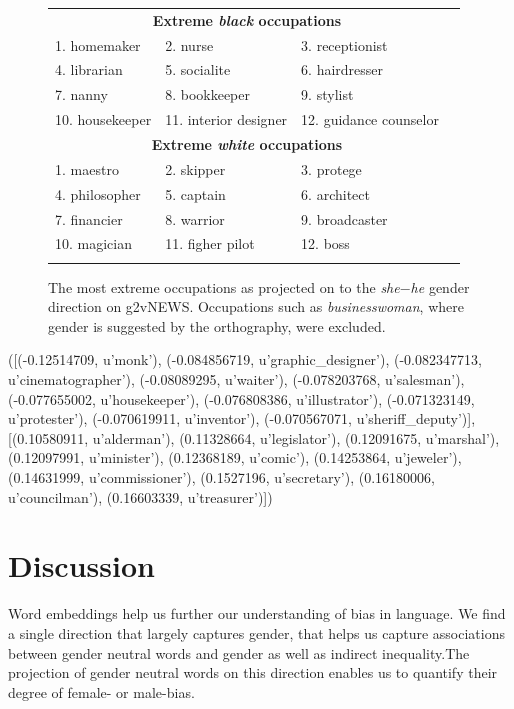 \documentclass{article}
\begin{document}
  \begin{figure}
\begin{tabular}{lllc}
\multicolumn{3}{c}{\bf{Extreme \emph{black} occupations}}\\
{1. homemaker} & {2. nurse} & {3. receptionist} \\
{4. librarian} & {5. socialite} & {6. hairdresser} \\
{7. nanny} & {8. bookkeeper} & {9. stylist} \\
{10. housekeeper} & {11. interior designer} & {12. guidance counselor} \\[2ex]
\multicolumn{3}{c}{{\bf Extreme \emph{white} occupations}}\\
{1. maestro} & {2. skipper} & {3. protege} \\
{4. philosopher} & {5. captain} & {6. architect} \\
{7. financier} & {8. warrior} & {9. broadcaster} \\
{10. magician} & {11. figher pilot} & {12. boss} \\
\\\end{tabular}
\caption{\label{fig:occupation_words} The most extreme occupations as projected on to the {\em she$-$he} gender direction on g2vNEWS. Occupations such as {\em businesswoman}, where gender is suggested by the orthography, were excluded.}
\end{figure}

  
  
  ([(-0.12514709, u'monk'),
  (-0.084856719, u'graphic_designer'),
  (-0.082347713, u'cinematographer'),
  (-0.08089295, u'waiter'),
  (-0.078203768, u'salesman'),
  (-0.077655002, u'housekeeper'),
  (-0.076808386, u'illustrator'),
  (-0.071323149, u'protester'),
  (-0.070619911, u'inventor'),
  (-0.070567071, u'sheriff_deputy')],
 [(0.10580911, u'alderman'),
  (0.11328664, u'legislator'),
  (0.12091675, u'marshal'),
  (0.12097991, u'minister'),
  (0.12368189, u'comic'),
  (0.14253864, u'jeweler'),
  (0.14631999, u'commissioner'),
  (0.1527196, u'secretary'),
  (0.16180006, u'councilman'),
  (0.16603339, u'treasurer')])



\fi



\section{Discussion}

Word embeddings help us further our understanding of bias in language. We find a single direction that largely captures gender, that helps us capture associations between gender neutral  words and gender as well as indirect inequality.The projection of gender neutral words on this direction enables us to quantify their degree of female- or male-bias.
\end{document}
